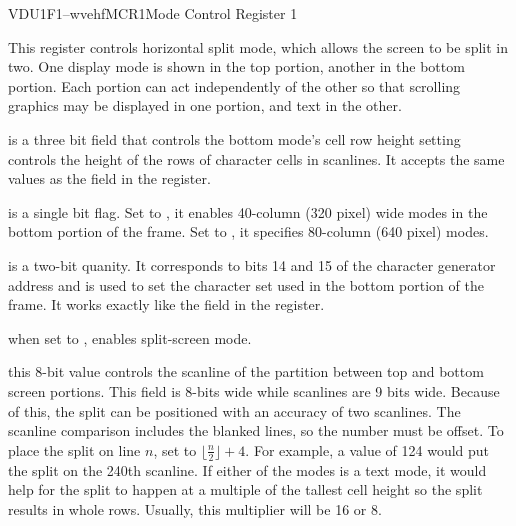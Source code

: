 \begin{ioport}{VDU}{1F1}{--wvehf}{MCR1}{Mode Control Register 1}

  This register controls horizontal split mode, which allows the screen to be
  split in two. One display mode is shown in the top portion, another in the
  bottom portion. Each portion can act independently of the other so that
  scrolling graphics may be displayed in one portion, and text in the other.

  \begin{cbitfield}
  \end{cbitfield}

  \begin{description}
     is a three bit field that controls the bottom mode's
    cell row height setting controls the height of the rows of character cells
    in scanlines. It accepts the same values as the  field in the
     register.
    
     is a single bit flag. Set to , it enables
    40-column (320 pixel) wide modes in the bottom portion of the frame. Set
    to , it specifies 80-column (640 pixel) modes.

     is a two-bit quanity. It corresponds to bits 14 and 15
    of the character generator address and is used to set the character set
    used in the bottom portion of the frame. It works exactly like the
     field in the  register.

     when set to , enables split-screen mode.

     this 8-bit value controls the scanline of the partition
    between top and bottom screen portions. This field is 8-bits wide while
    scanlines are 9 bits wide. Because of this, the split can be positioned
    with an accuracy of two scanlines. The scanline comparison includes the
    blanked lines, so the number must be offset. To place the split on line
    $n$, set  to $\lfloor\frac{n}{2}\rfloor+4$. For example, a value
    of 124 would put the split on the 240th scanline. If either of the modes is
    a text mode, it would help for the split to happen at a multiple of the
    tallest cell height so the split results in whole rows. Usually, this
    multiplier will be 16 or 8.
  \end{description}
\end{ioport}

